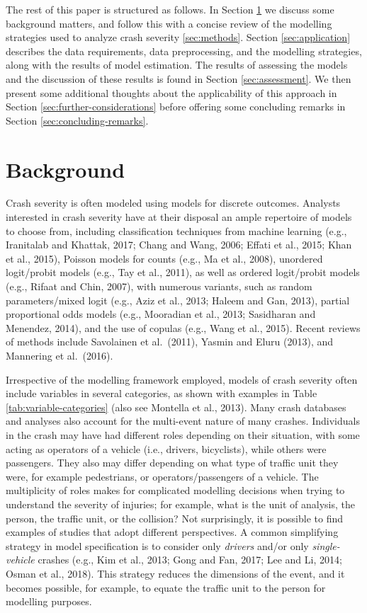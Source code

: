 \documentclass[]{elsarticle} %
\begin{document}
The rest of this paper is structured as follows. In Section
\ref{sec:background} we discuss some background matters, and follow this
with a concise review of the modelling strategies used to analyze crash
severity \ref{sec:methods}. Section \ref{sec:application} describes the
data requirements, data preprocessing, and the modelling strategies,
along with the results of model estimation. The results of assessing the
models and the discussion of these results is found in Section
\ref{sec:assessment}. We then present some additional thoughts about the
applicability of this approach in Section
\ref{sec:further-considerations} before offering some concluding remarks
in Section \ref{sec:concluding-remarks}.

\hypertarget{sec:background}{%
\section{Background}\label{sec:background}}

Crash severity is often modeled using models for discrete outcomes.
Analysts interested in crash severity have at their disposal an ample
repertoire of models to choose from, including classification techniques
from machine learning (e.g., Iranitalab and Khattak, 2017; Chang and
Wang, 2006; Effati et al., 2015; Khan et al., 2015), Poisson models for
counts (e.g., Ma et al., 2008), unordered logit/probit models (e.g., Tay
et al., 2011), as well as ordered logit/probit models (e.g., Rifaat and
Chin, 2007), with numerous variants, such as random parameters/mixed
logit (e.g., Aziz et al., 2013; Haleem and Gan, 2013), partial
proportional odds models (e.g., Mooradian et al., 2013; Sasidharan and
Menendez, 2014), and the use of copulas (e.g., Wang et al., 2015).
Recent reviews of methods include Savolainen et al.~(2011), Yasmin and
Eluru (2013), and Mannering et al.~(2016).

Irrespective of the modelling framework employed, models of crash
severity often include variables in several categories, as shown with
examples in Table \ref{tab:variable-categories} (also see Montella et
al., 2013). Many crash databases and analyses also account for the
multi-event nature of many crashes. Individuals in the crash may have
had different roles depending on their situation, with some acting as
operators of a vehicle (i.e., drivers, bicyclists), while others were
passengers. They also may differ depending on what type of traffic unit
they were, for example pedestrians, or operators/passengers of a
vehicle. The multiplicity of roles makes for complicated modelling
decisions when trying to understand the severity of injuries; for
example, what is the unit of analysis, the person, the traffic unit, or
the collision? Not surprisingly, it is possible to find examples of
studies that adopt different perspectives. A common simplifying strategy
in model specification is to consider only \emph{drivers} and/or only
\emph{single-vehicle} crashes (e.g., Kim et al., 2013; Gong and Fan,
2017; Lee and Li, 2014; Osman et al., 2018). This strategy reduces the
dimensions of the event, and it becomes possible, for example, to equate
the traffic unit to the person for modelling purposes.
\end{document}
